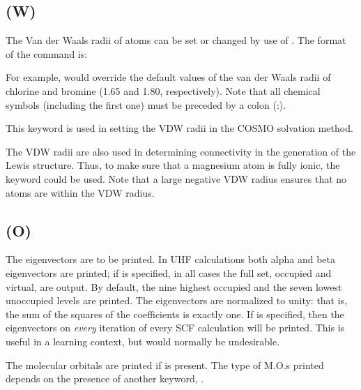 \subsection*{ (W)}
\label{key_vdw}

The Van der Waals radii of atoms can be set or changed by use of .
The format of the command is:


For example,  would override the default values
of the van der Waals radii of chlorine and bromine (1.65 and 1.80, respectively).
Note that all chemical symbols (including the first one) must be preceded
by a colon (:).

This keyword is used in setting the VDW radii in the COSMO solvation method.

The VDW radii are also used in determining connectivity in  the generation of
the Lewis structure.  Thus, to make sure that a magnesium  atom is  fully
ionic, the keyword \mbox{} could be used.  Note that a
large negative VDW  radius ensures that no atoms are within the VDW radius.

\subsection*{ (O)}


        The eigenvectors are to be printed.  In UHF calculations both  alpha
   and  beta  eigenvectors  are printed; if  is specified,
   in all cases the full set, occupied
   and virtual, are output.  By default, the nine highest occupied and the
seven lowest unoccupied levels
are printed.  The eigenvectors are normalized to unity:  that
   is, the  sum of the squares of the coefficients is exactly one.  If 
   is specified, then the eigenvectors  on  {\em every}  iteration  of  every  SCF
   calculation  will  be printed.  This is useful in a learning context, but
   would normally be undesirable.


The molecular orbitals are printed if  is present.  The type
of M.O.s printed depends on the presence of another keyword, .

